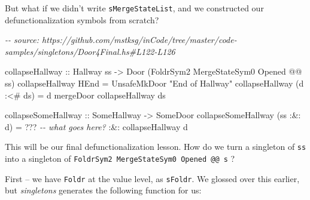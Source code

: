 \documentclass[]{article}
\newenvironment{Shaded}{}{}
\newcommand{\CommentTok}[1]{\textcolor[rgb]{0.38,0.63,0.69}{\textit{#1}}}
\newcommand{\DataTypeTok}[1]{\textcolor[rgb]{0.56,0.13,0.00}{#1}}
\newcommand{\NormalTok}[1]{#1}
\newcommand{\OperatorTok}[1]{\textcolor[rgb]{0.40,0.40,0.40}{#1}}
\newcommand{\OtherTok}[1]{\textcolor[rgb]{0.00,0.44,0.13}{#1}}
\newcommand{\StringTok}[1]{\textcolor[rgb]{0.25,0.44,0.63}{#1}}
\begin{document}
But what if we didn't write \texttt{sMergeStateList}, and we constructed our
defunctionalization symbols from scratch?

\begin{Shaded}
\begin{Highlighting}[]
\CommentTok{{-}{-} source: https://github.com/mstksg/inCode/tree/master/code{-}samples/singletons/Door4Final.hs\#L122{-}L126}

\NormalTok{collapseHallway\textquotesingle{}\textquotesingle{}}
\OtherTok{    ::} \DataTypeTok{Hallway}\NormalTok{ ss}
    \OtherTok{{-}>} \DataTypeTok{Door}\NormalTok{ (}\DataTypeTok{FoldrSym2} \DataTypeTok{MergeStateSym0} \DataTypeTok{\textquotesingle{}Opened} \OperatorTok{@@}\NormalTok{ ss)}
\NormalTok{collapseHallway\textquotesingle{}\textquotesingle{} }\DataTypeTok{HEnd}       \OtherTok{=} \DataTypeTok{UnsafeMkDoor} \StringTok{"End of Hallway"}
\NormalTok{collapseHallway\textquotesingle{}\textquotesingle{} (d }\OperatorTok{:<\#}\NormalTok{ ds) }\OtherTok{=}\NormalTok{ d }\OtherTok{\textasciigrave{}mergeDoor\textasciigrave{}}\NormalTok{ collapseHallway\textquotesingle{}\textquotesingle{} ds}

\OtherTok{collapseSomeHallway\textquotesingle{}\textquotesingle{} ::} \DataTypeTok{SomeHallway} \OtherTok{{-}>} \DataTypeTok{SomeDoor}
\NormalTok{collapseSomeHallway\textquotesingle{}\textquotesingle{} (ss }\OperatorTok{:\&:}\NormalTok{ d) }\OtherTok{=} \OperatorTok{???}    \CommentTok{{-}{-} what goes here?}
                               \OperatorTok{:\&:}\NormalTok{ collapseHallway\textquotesingle{}\textquotesingle{} d}
\end{Highlighting}
\end{Shaded}

This will be our final defunctionalization lesson. How do we turn a singleton of
\texttt{ss} into a singleton of
\texttt{FoldrSym2\ MergeStateSym0\ \textquotesingle{}Opened\ @@\ s} ?

First -- we have \texttt{Foldr} at the value level, as \texttt{sFoldr}. We
glossed over this earlier, but \emph{singletons} generates the following
function for us:
\end{document}
